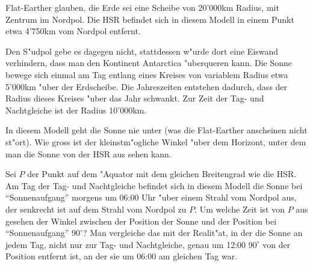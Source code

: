 Flat-Earther glauben, die Erde sei eine Scheibe von 20'000km Radius,
mit Zentrum im Nordpol.
Die HSR befindet sich in diesem Modell in einem Punkt etwa 4'750km
vom Nordpol entfernt.

Den S"udpol gebe es dagegen nicht, stattdessen w"urde dort eine Eiswand
verhindern, dass man den Kontinent Antarctica "uberqueren kann.
Die Sonne bewege sich einmal am Tag entlang eines Kreises von variablem
Radius etwa 5'000km "uber der Erdscheibe.
Die Jahreszeiten entstehen dadurch, dass der Radius dieses Kreises
"uber das Jahr schwankt.
Zur Zeit der Tag- und Nachtgleiche ist der Radius 10'000km.

\begin{teilaufgaben}
\item
In diesem Modell geht die Sonne nie unter (was die Flat-Earther anscheinen
nicht st"ort).
Wie gross ist der kleinstm"ogliche Winkel "uber dem Horizont, unter dem
man die Sonne von der HSR aus sehen kann.
\item
Sei $P$ der Punkt auf dem "Aquator mit dem gleichen Breitengrad wie
die HSR.
Am Tag der Tag- und Nachtgleiche befindet sich in diesem Modell
die Sonne bei ``Sonnenaufgang'' morgens um 06:00 Uhr "uber einem Strahl
vom Nordpol aus, der senkrecht ist auf dem Strahl vom Nordpol zu $P$.
Um welche Zeit ist von $P$ aus gesehen der Winkel zwischen der Position
der Sonne und der Position bei ``Sonnenaufgang'' $90^\circ$?
Man vergleiche das mit der Realit"at, in der die Sonne an jedem Tag,
nicht nur zur Tag- und Nachtgleiche, genau um 12:00 
$90^\circ$ von der Position entfernt ist, an der sie um 06:00 am
gleichen Tag war.
\end{teilaufgaben}

